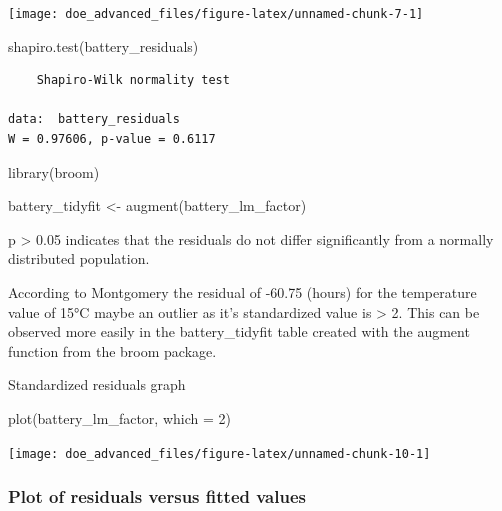 \documentclass[
]{book}
\newenvironment{Shaded}{\begin{snugshade}}{\end{snugshade}}
\newcommand{\AttributeTok}[1]{\textcolor[rgb]{0.77,0.63,0.00}{#1}}
\newcommand{\DecValTok}[1]{\textcolor[rgb]{0.00,0.00,0.81}{#1}}
\newcommand{\FunctionTok}[1]{\textcolor[rgb]{0.00,0.00,0.00}{#1}}
\newcommand{\NormalTok}[1]{#1}
\newcommand{\OtherTok}[1]{\textcolor[rgb]{0.56,0.35,0.01}{#1}}
\begin{document}
\texttt{[image: doe\_advanced\_files/figure-latex/unnamed-chunk-7-1]}

\begin{Shaded}
\begin{Highlighting}[]
\FunctionTok{shapiro.test}\NormalTok{(battery\_residuals)}
\end{Highlighting}
\end{Shaded}

\begin{verbatim}
	Shapiro-Wilk normality test

data:  battery_residuals
W = 0.97606, p-value = 0.6117
\end{verbatim}

\begin{Shaded}
\begin{Highlighting}[]
\FunctionTok{library}\NormalTok{(broom)}
\end{Highlighting}
\end{Shaded}

\begin{Shaded}
\begin{Highlighting}[]
\NormalTok{battery\_tidyfit }\OtherTok{\textless{}{-}} \FunctionTok{augment}\NormalTok{(battery\_lm\_factor)}
\end{Highlighting}
\end{Shaded}

p \textgreater{} 0.05 indicates that the residuals do not differ significantly from a normally distributed population.

According to Montgomery the residual of -60.75 (hours) for the temperature value of 15°C maybe an outlier as it's standardized value is \textgreater{} 2.
This can be observed more easily in the battery\_tidyfit table created with the augment function from the broom package.

Standardized residuals graph

\begin{Shaded}
\begin{Highlighting}[]
\FunctionTok{plot}\NormalTok{(battery\_lm\_factor, }\AttributeTok{which =} \DecValTok{2}\NormalTok{)}
\end{Highlighting}
\end{Shaded}

\texttt{[image: doe\_advanced\_files/figure-latex/unnamed-chunk-10-1]}

\hypertarget{plot-of-residuals-versus-fitted-values}{%
\subsubsection{Plot of residuals versus fitted values}\label{plot-of-residuals-versus-fitted-values}}
\end{document}
